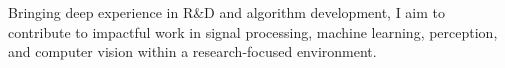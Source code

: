 \textcolor{blocktext1_color}{Bringing deep experience in R\&D and algorithm development, I aim to contribute to impactful work in signal processing, machine learning, perception, and computer vision within a research-focused environment.}